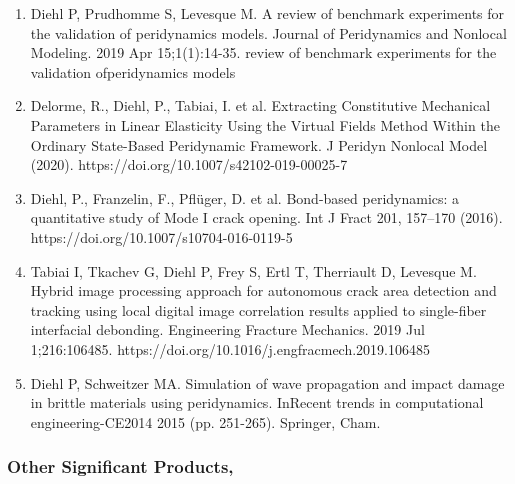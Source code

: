 \documentclass[svgnames,11pt]{article}
\begin{document}
\begin{enumerate}
    \item Diehl P, Prudhomme S, Levesque M. A review of benchmark experiments for the validation of peridynamics models. Journal of Peridynamics and Nonlocal Modeling. 2019 Apr 15;1(1):14-35.   review  of  benchmark  experiments  for  the  validation  ofperidynamics models
    \item Delorme, R., Diehl, P., Tabiai, I. et al. Extracting Constitutive Mechanical Parameters in Linear Elasticity Using the Virtual Fields Method Within the Ordinary State-Based Peridynamic Framework. J Peridyn Nonlocal Model (2020). https://doi.org/10.1007/s42102-019-00025-7
    \item Diehl, P., Franzelin, F., Pfl\"uger, D. et al. Bond-based peridynamics: a quantitative study of Mode I crack opening. Int J Fract 201, 157--170 (2016). https://doi.org/10.1007/s10704-016-0119-5
    \item Tabiai I, Tkachev G, Diehl P, Frey S, Ertl T, Therriault D, Levesque M. Hybrid image processing approach for autonomous crack area detection and tracking using local digital image correlation results applied to single-fiber interfacial debonding. Engineering Fracture Mechanics. 2019 Jul 1;216:106485. https://doi.org/10.1016/j.engfracmech.2019.106485
    \item Diehl P, Schweitzer MA. Simulation of wave propagation and impact damage in brittle materials using peridynamics. InRecent trends in computational engineering-CE2014 2015 (pp. 251-265). Springer, Cham.
\end{enumerate}

\subsubsection{Other Significant Products,}
\end{document}
